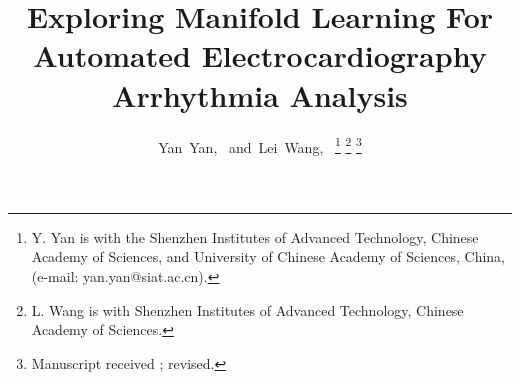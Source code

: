 \documentclass[journal]{IEEEtran}
\begin{document}
%
\title{Exploring Manifold Learning For Automated Electrocardiography Arrhythmia Analysis}

%
%
%

\author{Yan~Yan,~
        and~Lei~Wang,~\IEEEmembership{}%
\thanks{Y. Yan is with the Shenzhen Institutes of Advanced Technology, Chinese Academy of Sciences, and University of Chinese Academy of Sciences, China, (e-mail: yan.yan@siat.ac.cn).}%
\thanks{L. Wang is with Shenzhen Institutes of Advanced Technology, Chinese Academy of Sciences.}%
\thanks{Manuscript received ; revised. }}

% 
%
\end{document}
